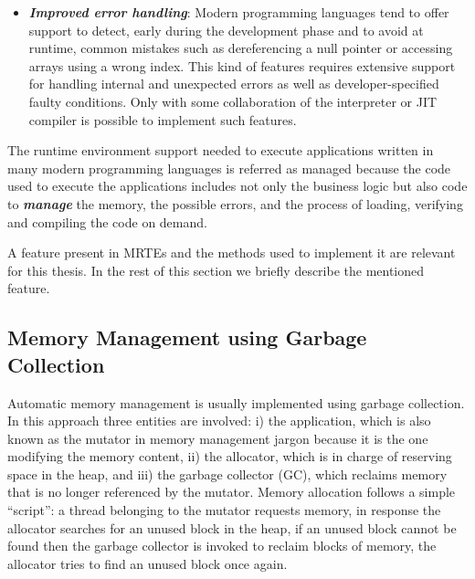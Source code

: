\begin{itemize}
\item \textbf{\textit{Improved error handling}}:
Modern programming languages tend to offer support to detect, early during the development phase and to avoid at runtime, common mistakes such as dereferencing a null pointer or accessing arrays using a wrong index.
This kind of features requires extensive support for handling internal and unexpected errors as well as developer-specified faulty conditions.
Only with some collaboration of the interpreter or JIT compiler is possible to implement such features.
\end{itemize}   

The runtime environment support needed to execute applications written in many modern programming languages is referred as managed because the code used to execute the applications includes not only the business logic but also code to \textit{\textbf{manage}} the memory, the possible errors, and the process of loading, verifying and compiling the code on demand.

A feature present in MRTEs and the methods used to implement it are relevant for this thesis.
In the rest of this section we briefly describe the mentioned feature.

\subsection{Memory Management using Garbage Collection}

Automatic memory management is usually implemented using garbage collection.
In this approach three entities are involved: i) the application, which is also known as the mutator in memory management jargon because it is the one modifying the memory content, ii) the allocator, which is in charge of reserving space in the heap, and iii) the garbage collector (GC), which reclaims memory that is no longer referenced by the mutator.
Memory allocation follows a simple ``script'': a thread belonging to the mutator requests memory, in response the allocator searches for an unused block in the heap, if an unused block cannot be found then the garbage collector is invoked to reclaim blocks of memory, the allocator tries to find an unused block once again.


